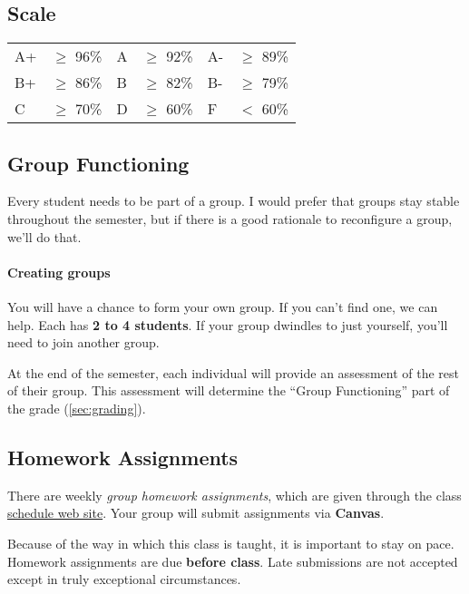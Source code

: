 \documentclass[11pt]{article}
\begin{document}
\subsection{Scale}\label{scale}

\begin{center}
    \begin{tabular}{ll|ll|ll}
    A+ & $\ge$ 96\% & A & $\ge$  92\% & A- & $\ge$ 89\% \\
    B+ & $\ge$  86\% & B & $\ge$  82\% & B- & $\ge$ 79\% \\
    C & $\ge$  70\% & D & $\ge$  60\% & F & $<$ 60\% \\
    \end{tabular}
\end{center}
    

\subsection{Group Functioning}\label{group-functioning}

Every student needs to be part of a group. I would prefer that groups
stay stable throughout the semester, but if there is a good rationale to
reconfigure a group, we'll do that.



\paragraph{Creating groups} You will have a chance to form your own group.
If you can't find one, we can help. Each has  \textbf{2 to 4 students}. If your group dwindles to just yourself, you'll need to join another group.

At the end of the semester, each individual will provide an assessment
of the rest of their group. This assessment will determine the ``Group Functioning'' part of the grade (\autoref{sec:grading}).

\subsection{Homework Assignments}\label{homework-assignments}

There are weekly \emph{group homework assignments}, which are given through the class \href{https://nguyenthanhvuh.github.io/class-oo/assignments}{schedule web site}. Your group will submit assignments via \textbf{Canvas}.

Because of the way in which this class is taught, it is important to
stay on pace. Homework assignments are due \textbf{before class}. Late submissions
are not accepted except in truly exceptional circumstances.
\end{document}
